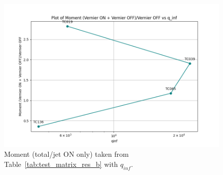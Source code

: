 \documentclass[12pt]{article}
\begin{document}
\begin{figure}[H]
    \centering
    \includegraphics[width=\linewidth]{figs/M_vs_qinf.png}
    \caption{Moment (total/jet ON only) taken from Table~\ref{tab:test_matrix_res_b} with $q_{inf}$.}
    \label{fig:M_vs_qinf}
\end{figure}
\end{document}
